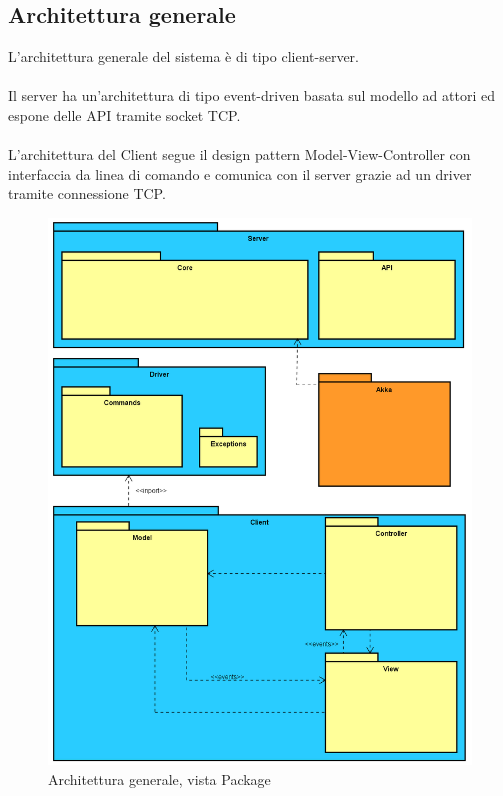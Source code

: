 \documentclass[a4paper]{article}
\begin{document}
		\subsection{Architettura generale}
        	L'architettura generale del sistema è di tipo client-server. \\ \\
            Il server ha un'architettura di tipo event-driven basata sul modello ad attori ed espone delle API tramite socket TCP. \\ \\
            L'architettura del Client segue il design pattern Model-View-Controller con interfaccia da linea di comando e comunica con il server  grazie ad un driver tramite connessione TCP.
            
        \begin{figure} [H]
			\centering
			\includegraphics[scale=0.25]{Packages_Generale.png}
			\caption{Architettura generale, vista Package}
		\end{figure}
		
\end{document}
